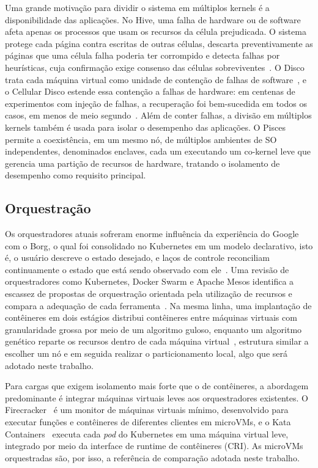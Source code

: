 \documentclass[12pt]{article}
\begin{document}
Uma grande motivação para dividir o sistema em múltiplos kernels é a disponibilidade das aplicações. No Hive, uma
falha de hardware ou de software afeta apenas os processos que usam os recursos da célula prejudicada.
O sistema protege cada página contra escritas de outras células, descarta preventivamente as páginas que uma célula falha
poderia ter corrompido e detecta falhas por heurísticas, cuja confirmação exige consenso das células
sobreviventes~\cite{chapin1995hive}. O Disco trata cada máquina virtual como unidade de contenção de falhas de
software~\cite{bugnion1997disco}, e o Cellular Disco estende essa contenção a falhas de hardware: em centenas de
experimentos com injeção de falhas, a recuperação foi bem-sucedida em todos os casos, em menos de meio
segundo~\cite{govil2000cellular}. Além de conter falhas, a divisão em múltiplos kernels também é usada para isolar
o desempenho das aplicações. O Pisces~\cite{ouyang2015pisces} permite a coexistência, em um mesmo nó, de múltiplos
ambientes de SO independentes, denominados enclaves, cada um executando um co-kernel leve que gerencia uma partição
de recursos de hardware, tratando o isolamento de desempenho como requisito principal.

\subsection{Orquestração}\label{sec:rel-orquestracao}

Os orquestradores atuais sofreram enorme influência da experiência do Google com o Borg, o qual foi
consolidado no Kubernetes em um modelo declarativo, isto é, o usuário descreve o estado desejado, e laços de controle
reconciliam continuamente o estado que está sendo observado com ele~\cite{burns2016borg}.
Uma revisão de orquestradores como Kubernetes, Docker Swarm e Apache Mesos identifica a escassez de propostas de
orquestração orientada pela utilização de recursos e compara a adequação de cada ferramenta~\cite{swetha2025resource}.
Na mesma linha, uma implantação de contêineres em dois estágios distribui contêineres entre máquinas virtuais com
granularidade grossa por meio de um algoritmo guloso, enquanto um algoritmo genético reparte os recursos dentro de
cada máquina virtual~\cite{lu2025optimized}, estrutura similar a escolher um nó e em seguida realizar o particionamento local,
algo que será adotado neste trabalho.

Para cargas que exigem isolamento mais forte que o de contêineres, a abordagem predominante é integrar máquinas
virtuais leves aos orquestradores existentes. O Firecracker~\cite{agache2020firecracker} é um monitor de máquinas
virtuais mínimo, desenvolvido para executar funções e contêineres de diferentes clientes em microVMs, e o
Kata Containers~\cite{katacontainers} executa cada \textit{pod} do Kubernetes em uma máquina virtual leve, integrado
por meio da interface de runtime de contêineres (CRI).
As microVMs orquestradas são, por isso, a referência de comparação adotada neste trabalho.
\end{document}
